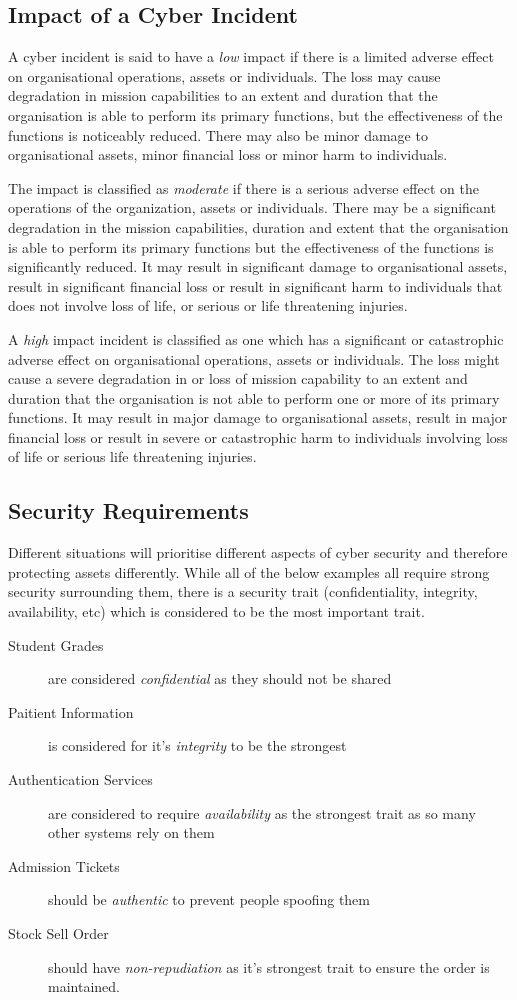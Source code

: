 \subsection{Impact of a Cyber Incident}
A cyber incident is said to have a \textit{low} impact if there is a limited adverse effect on organisational operations, assets or individuals. The loss may cause degradation in mission capabilities to an extent and duration that the organisation is able to perform its primary functions, but the effectiveness of the functions is noticeably reduced. There may also be minor damage to organisational assets, minor financial loss or minor harm to individuals. 

The impact is classified as \textit{moderate} if there is a serious adverse effect on the operations of the organization, assets or individuals. There may be a significant degradation in the mission capabilities, duration and extent that the organisation is able to perform its primary functions but the effectiveness of the functions is significantly reduced. It may result in significant damage to organisational assets, result in significant financial loss or result in significant harm to individuals that does not involve loss of life, or serious or life threatening injuries.

A \textit{high} impact incident is classified as one which has a significant or catastrophic adverse effect on organisational operations, assets or individuals. The loss might cause a severe degradation in or loss of mission capability to an extent and duration that the organisation is not able to perform one or more of its primary functions. It may result in major damage to organisational assets, result in major financial loss or result in severe or catastrophic harm to individuals involving loss of life or serious life threatening injuries.

\subsection{Security Requirements}
Different situations will prioritise different aspects of cyber security and therefore protecting assets differently. While all of the below examples all require strong security surrounding them, there is a security trait (confidentiality, integrity, availability, etc) which is considered to be the most important trait.

\begin{description}
    \item[Student Grades] are considered \textit{confidential} as they should not be shared
    \item[Paitient Information] is considered for it's \textit{integrity} to be the strongest
    \item[Authentication Services] are considered to require \textit{availability} as the strongest trait as so many other systems rely on them
    \item[Admission Tickets] should be \textit{authentic} to prevent people spoofing them
    \item[Stock Sell Order] should have \textit{non-repudiation} as it's strongest trait to ensure the order is maintained. 
\end{description}

